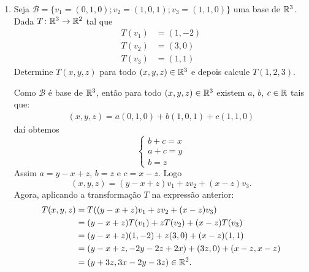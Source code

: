 \begin{exemplos}
    \begin{enumerate}[label={\arabic*})]
        \item Seja $\mathcal{B} = \{v_1 = (0, 1, 0); v_2 = (1, 0, 1); v_3 = (1, 1, 0)\}$ uma base de $\mathbb{R}^3$. Dada $T \colon \mathbb{R}^3 \to \mathbb{R}^2$ tal que
        \begin{align*}
            T(v_1) &= (1, -2)\\
            T(v_2) &= (3, 0)\\
            T(v_3) &= (1, 1)
        \end{align*}
        Determine $T(x, y, z)$ para todo $(x, y, z) \in \mathbb{R}^3$ e depois calcule $T(1, 2, 3)$.
        \begin{solucao}
            Como $\mathcal{B}$ é base de $\mathbb{R}^3$, então para todo $(x, y, z) \in \mathbb{R}^3$ existem $a$, $b$, $c \in \mathbb{R}$ tais que:
            \begin{align*}
                (x, y, z) = a(0, 1, 0) + b(1, 0, 1) + c(1, 1, 0)
            \end{align*}
            daí obtemos
            \[
                \begin{cases}
                    b + c = x\\
                    a + c = y\\
                    b = z
                \end{cases}
            \]
            Assim $a = y - x + z$, $b = z$ e $c = x - z$. Logo
            \[
                (x, y, z) = (y - x + z)v_1 + zv_2 + (x - z)v_3.
            \]
            Agora, aplicando a transformação $T$ na expressão anterior:
            \begin{align*}
                T(x, y, z) &= T((y - x + z)v_1 + zv_2 + (x - z)v_3) \\ &= (y - x + z)T(v_1) + zT(v_2) + (x - z)T(v_3) \\ &= (y - x + z)(1, -2) + z(3, 0) + (x - z)(1, 1) \\ &= (y - x + z, -2y - 2z + 2x) + (3z, 0) + (x - z, x - z) \\ &= (y + 3z, 3x - 2y - 3z) \in \mathbb{R}^2.
            \end{align*}


\end{solucao}
\end{enumerate}
\end{exemplos}
